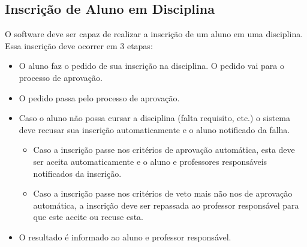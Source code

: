 \documentclass{article}
\begin{document}
\subsection{Inscrição de Aluno em Disciplina}
O software deve ser capaz de realizar a inscrição de um aluno em uma disciplina. Essa inscrição deve ocorrer em 3 etapas:
\begin{itemize}
    \item O aluno faz o pedido de sua inscrição na disciplina. O pedido vai para o processo de aprovação.
    \item O pedido passa pelo processo de aprovação.
    \item Caso o aluno não possa cursar a disciplina (falta requisito, etc.) o sistema deve recusar sua inscrição automaticamente e o aluno notificado da falha.
    \begin{itemize}
        \item Caso a inscrição passe nos critérios de aprovação automática, esta deve ser aceita automaticamente e o aluno e professores responsáveis notificados da inscrição.
        \item Caso a inscrição passe nos critérios de veto mais não nos de aprovação automática, a inscrição deve ser repassada ao professor responsável para que este aceite ou recuse esta.
    \end{itemize}
    \item O resultado é informado ao aluno e professor responsável.
\end{itemize}
\end{document}
